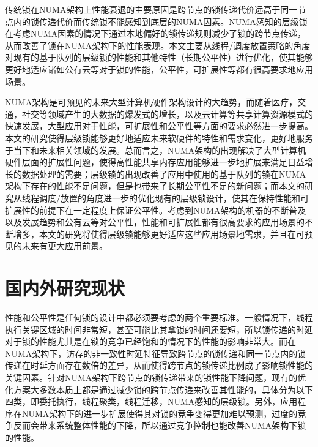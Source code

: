 传统锁在NUMA架构上性能衰退的主要原因是跨节点的锁传递代价远高于同一节点内的锁传递代价而传统锁不能感知到底层的NUMA因素。NUMA感知的层级锁在考虑NUMA因素的情况下通过本地偏好的锁传递规则减少了锁的跨节点传递，从而改善了锁在NUMA架构下的性能表现。本文主要从线程/调度放置策略的角度对现有的基于队列的层级锁的性能和其他特性（长期公平性）进行优化，使其能够更好地适应诸如公有云等对于锁的性能，公平性，可扩展性等都有很高要求地应用场景。

NUMA架构是可预见的未来大型计算机硬件架构设计的大趋势，而随着医疗，交通，社交等领域产生的大数据的爆发式的增长，以及云计算等共享计算资源模式的快速发展，大型应用对于性能，可扩展性和公平性等方面的要求必然进一步提高。本文的研究使得层级锁能够更好地适应未来软硬件的特性和需求变化，更好地服务于当下和未来相关领域的发展。总而言之，NUMA架构的出现解决了大型计算机硬件层面的扩展性问题，使得高性能共享内存应用能够进一步地扩展来满足日益增长的数据处理的需要；层级锁的出现改善了应用中使用的基于队列的锁在NUMA架构下存在的性能不足问题，但是也带来了长期公平性不足的新问题；而本文的研究从线程调度/放置的角度进一步的优化现有的层级锁设计，使其在保持性能和可扩展性的前提下在一定程度上保证公平性。考虑到NUMA架构的机器的不断普及以及发展趋势和公有云等对公平性，性能和可扩展性都有很高要求的应用场景的不断增多，本文的研究将使得层级锁能够更好适应这些应用场景地需求，并且在可预见的未来有更大应用前景。
\section{国内外研究现状}
性能和公平性是任何锁的设计中都必须要考虑的两个重要标准\cite{chabbi2015high}。一般情况下，线程执行关键区域的时间非常短，甚至可能比其拿锁的时间还要短\cite{johnson2010decoupling}，所以锁传递的时延对于锁的性能尤其是在锁的竞争已经饱和的情况下的性能的影响非常大。而在NUMA架构下，访存的非一致性时延特征导致跨节点的锁传递和同一节点内的锁传递在时延方面存在数倍的差异，从而使得跨节点的锁传递比例成了影响锁性能的关键因素。针对NUMA架构下跨节点的锁传递带来的锁性能下降问题，现有的优化方案大多数本质上都是通过减少锁的跨节点传递来改善其性能的，具体分为以下四类，即委托执行，线程聚类，线程迁移，NUMA感知的层级锁。另外，应用程序在NUMA架构下的进一步扩展使得其对锁的竞争变得更加难以预测，过度的竞争反而会带来系统整体性能的下降，所以通过竞争控制也能改善NUMA架构下锁的性能。

